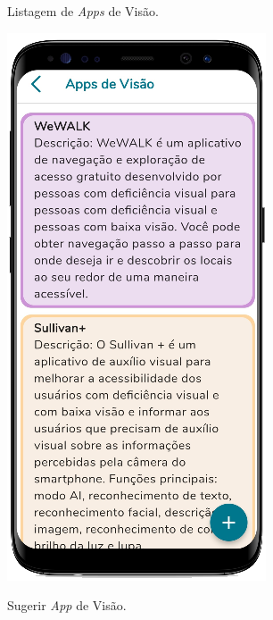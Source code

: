 \begin{figure}[htb]
    \centering
    \begin{minipage}{0.45\textwidth}
        \centering
        \caption{Listagem de \emph{Apps} de Visão.}\label{fig_list_apps_visao}
        \includegraphics[scale=0.66]{Imagens/desenvolvimento/app/list_apps_visao.png}
    \end{minipage}
    \hfill
    \begin{minipage}{0.45\textwidth}
        \centering
        \caption{Sugerir \emph{App} de Visão.}\label{fig_sug_apps_visao}

\end{minipage}
\end{figure}
